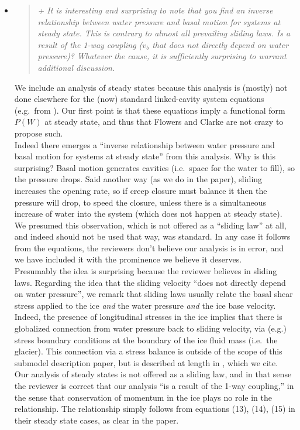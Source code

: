 \documentclass[11pt,reqno]{amsart}
\newcommand{\reply}[2]{
\medskip\medskip
\item  \begin{quote}
\emph{#1}
\end{quote}

\medskip
\noindent #2}
\begin{document}
\begin{itemize}
\reply{\label{inversepage} + It is interesting and surprising to note that you find an inverse relationship between
water pressure and basal motion for systems at steady state. This is contrary to almost
all prevailing sliding laws. Is a result of the 1-way coupling ($v_b$ that does not directly
depend on water pressure)? Whatever the cause, it is sufficiently surprising to warrant
additional discussion.}
{We include an analysis of steady states because this analysis is (mostly) not done elsewhere for the (now) standard linked-cavity system equations (e.g.~from \cite{Hewitt2011,Schoofetal2012}).  Our first point is that these equations imply a functional form $P(W)$ at steady state, and thus that Flowers and Clarke \cite{FlowersClarke2002} are not crazy to propose such.\\
\indent Indeed there emerges a ``inverse relationship between water pressure and basal motion for systems at steady state'' from this analysis.  Why is this surprising?  Basal motion generates cavities (i.e.~space for the water to fill), so the pressure drops.  Said another way (as we do in the paper), sliding increases the opening rate, so if creep closure must balance it then the pressure will drop, to speed the closure, unless there is a simultaneous increase of water into the system (which does not happen at steady state).  We presumed this observation, which is not offered as a ``sliding law'' at all, and indeed should not be used that way, was standard.  In any case it follows from the equations, the reviewers don't believe our analysis is in error, and we have included it with the prominence we believe it deserves. \\
\indent Presumably the idea is surprising because the reviewer believes in sliding laws.  Regarding the idea that the sliding velocity ``does not directly
depend on water pressure'', we remark that sliding laws usually relate the basal shear stress applied to the ice \emph{and} the water pressure \emph{and} the ice base velocity.  Indeed, the presence of longitudinal stresses in the ice implies that there is globalized connection from water pressure back to sliding velocity, via (e.g.) stress boundary conditions at the boundary of the ice fluid mass (i.e.~the glacier).  This connection via a stress balance is outside of the scope of this submodel description paper, but is described at length in \cite{BBssasliding}, which we cite.\\
\indent Our analysis of steady states is not offered as a sliding law, and in that sense the reviewer is correct that our analysis ``is a result of the 1-way coupling,'' in the sense that conservation of momentum in the ice plays no role in the relationship.  The relationship simply follows from equations (13), (14), (15) in their steady state cases, as clear in the paper.}


\end{itemize}
\end{document}
